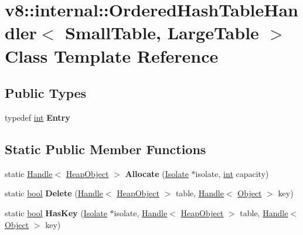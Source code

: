 \hypertarget{classv8_1_1internal_1_1OrderedHashTableHandler}{}\section{v8\+:\+:internal\+:\+:Ordered\+Hash\+Table\+Handler$<$ Small\+Table, Large\+Table $>$ Class Template Reference}
\label{classv8_1_1internal_1_1OrderedHashTableHandler}
\subsection*{Public Types}
\begin{DoxyCompactItemize}
\item 
\mbox{\label{classv8_1_1internal_1_1OrderedHashTableHandler_aa622323df83f436d1df2ecc355361c46}} 
typedef \mbox{\hyperlink{classint}{int}} {\bfseries Entry}
\end{DoxyCompactItemize}
\subsection*{Static Public Member Functions}
\begin{DoxyCompactItemize}
\item 
\mbox{\label{classv8_1_1internal_1_1OrderedHashTableHandler_a2871093d4a8e114846e6b0852aef5ef2}} 
static \mbox{\hyperlink{classv8_1_1internal_1_1Handle}{Handle}}$<$ \mbox{\hyperlink{classv8_1_1internal_1_1HeapObject}{Heap\+Object}} $>$ {\bfseries Allocate} (\mbox{\hyperlink{classv8_1_1internal_1_1Isolate}{Isolate}} $\ast$isolate, \mbox{\hyperlink{classint}{int}} capacity)
\item 
\mbox{\label{classv8_1_1internal_1_1OrderedHashTableHandler_a9e39d9e053beaf02cff3d2425b2fd2c8}} 
static \mbox{\hyperlink{classbool}{bool}} {\bfseries Delete} (\mbox{\hyperlink{classv8_1_1internal_1_1Handle}{Handle}}$<$ \mbox{\hyperlink{classv8_1_1internal_1_1HeapObject}{Heap\+Object}} $>$ table, \mbox{\hyperlink{classv8_1_1internal_1_1Handle}{Handle}}$<$ \mbox{\hyperlink{classv8_1_1internal_1_1Object}{Object}} $>$ key)
\item 
\mbox{\label{classv8_1_1internal_1_1OrderedHashTableHandler_aa37a4a8367483c48a1b17e42dc1a5d4e}} 
static \mbox{\hyperlink{classbool}{bool}} {\bfseries Has\+Key} (\mbox{\hyperlink{classv8_1_1internal_1_1Isolate}{Isolate}} $\ast$isolate, \mbox{\hyperlink{classv8_1_1internal_1_1Handle}{Handle}}$<$ \mbox{\hyperlink{classv8_1_1internal_1_1HeapObject}{Heap\+Object}} $>$ table, \mbox{\hyperlink{classv8_1_1internal_1_1Handle}{Handle}}$<$ \mbox{\hyperlink{classv8_1_1internal_1_1Object}{Object}} $>$ key)
\end{DoxyCompactItemize}
